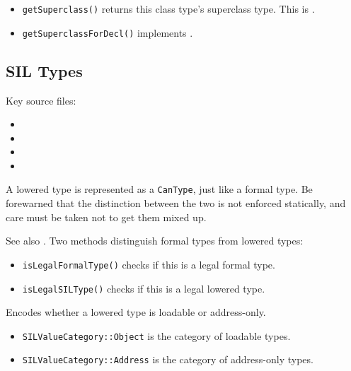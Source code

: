 \documentclass[../generics]{subfiles}
\begin{document}
\begin{itemize}
\item \texttt{getSuperclass()} returns this class type's superclass type. This is .
\item \texttt{getSuperclassForDecl()} implements .
\end{itemize}

\subsection*{SIL Types}

Key source files:
\begin{itemize}
\item {}
\item {}
\item {}
\item {}
\end{itemize}

A lowered type is represented as a \texttt{CanType}, just like a formal type. Be forewarned that the distinction between the two is not enforced statically, and care must be taken not to get them mixed up.

See also . Two methods distinguish formal types from lowered types:
\begin{itemize}
\item \texttt{isLegalFormalType()} checks if this is a legal formal type.
\item \texttt{isLegalSILType()} checks if this is a legal lowered type.
\end{itemize}

Encodes whether a lowered type is loadable or address-only.
\begin{itemize}
\item \texttt{SILValueCategory::Object} is the category of loadable types.
\item \texttt{SILValueCategory::Address} is the category of address-only types.
\end{itemize}
\end{document}
